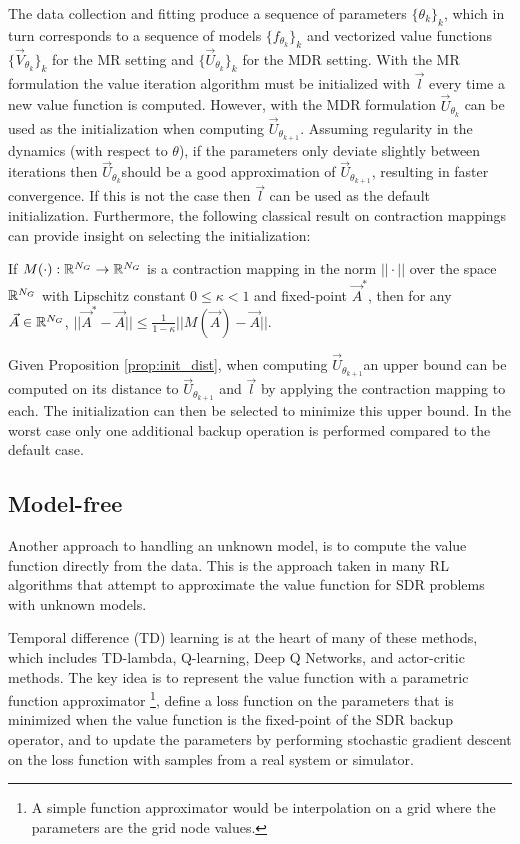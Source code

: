 The data collection and fitting produce a sequence of parameters $\{\theta_k\}_k$, which in turn corresponds to a sequence of models $\{f_{\theta_k}\}_k$ and vectorized value functions $\{\vec{V}_{\theta_k}\}_k$ for the MR setting and $\{\vec{U}_{\theta_k}\}_k$ for the MDR setting. With the MR formulation the value iteration algorithm must be initialized with $\vec{l}$ every time a new value function is computed. However, with the MDR formulation $\vec{U}_{\theta_k}$ can be used as the initialization when computing $\vec{U}_{\theta_{k+1}}$. Assuming regularity in the dynamics (with respect to $\theta$), if the parameters only deviate slightly between iterations then $\vec{U}_{\theta_{k}}$should be a good approximation of $\vec{U}_{\theta_{k+1}}$, resulting in faster convergence. If this is not the case then $\vec{l}$ can be used as the default initialization. Furthermore, the following classical result on contraction mappings can provide insight on selecting the initialization:  
%
\begin{proposition} \label{prop:init_dist}
If $M(\cdot): \mathbb{R}^{N_G} \rightarrow \mathbb{R}^{N_G}$ is a contraction mapping in the norm $|| \cdot ||$ over the space $\mathbb{R}^{N_G}$ with Lipschitz constant $0\leq \kappa < 1$ and fixed-point $\vec{A}^*$, then for any ${\vec{A} \in \mathbb{R}^{N_G}}$,  ${||\vec{A}^* - \vec{A}|| \leq \frac{1}{1-\kappa}||M(\vec{A}) - \vec{A}||}$. 
\end{proposition}

Given Proposition \ref{prop:init_dist}, when computing $\vec{U}_{\theta_{k+1}}$an upper bound can be computed on its distance to $\vec{U}_{\theta_{k+1}}$ and $\vec{l}$ by applying the contraction mapping to each. The initialization can then be selected to minimize this upper bound. In the worst case only one additional backup operation is performed compared to the default case. 

\subsection{Model-free}

Another approach to handling an unknown model, is to compute the value function directly from the data. This is the approach taken in many RL algorithms that attempt to approximate the value function for SDR problems with unknown models.

Temporal difference (TD) learning is at the heart of many of these methods, which includes TD-lambda, Q-learning, Deep Q Networks, and actor-critic methods. The key idea is to represent the value function with a parametric function approximator \footnote{A simple function approximator would be interpolation on a grid where the parameters are the grid node values.}, define a loss function on the parameters that is minimized when the value function is the fixed-point of the SDR backup operator, and to update the parameters by performing stochastic gradient descent on the loss function with samples from a real system or simulator.

